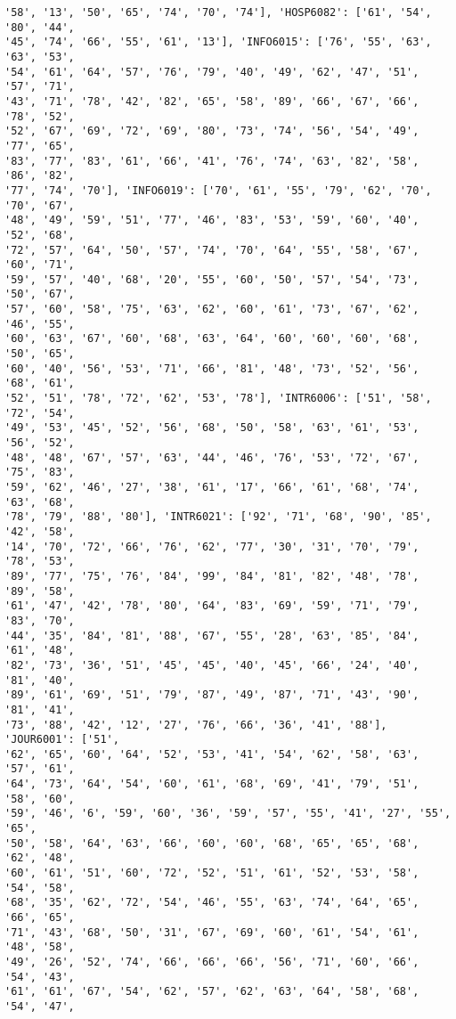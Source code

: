 \documentclass[11pt]{article}
\begin{document}
\begin{Verbatim}[commandchars=\\\{\}]
'58', '13', '50', '65', '74', '70', '74'], 'HOSP6082': ['61', '54', '80', '44',
'45', '74', '66', '55', '61', '13'], 'INFO6015': ['76', '55', '63', '63', '53',
'54', '61', '64', '57', '76', '79', '40', '49', '62', '47', '51', '57', '71',
'43', '71', '78', '42', '82', '65', '58', '89', '66', '67', '66', '78', '52',
'52', '67', '69', '72', '69', '80', '73', '74', '56', '54', '49', '77', '65',
'83', '77', '83', '61', '66', '41', '76', '74', '63', '82', '58', '86', '82',
'77', '74', '70'], 'INFO6019': ['70', '61', '55', '79', '62', '70', '70', '67',
'48', '49', '59', '51', '77', '46', '83', '53', '59', '60', '40', '52', '68',
'72', '57', '64', '50', '57', '74', '70', '64', '55', '58', '67', '60', '71',
'59', '57', '40', '68', '20', '55', '60', '50', '57', '54', '73', '50', '67',
'57', '60', '58', '75', '63', '62', '60', '61', '73', '67', '62', '46', '55',
'60', '63', '67', '60', '68', '63', '64', '60', '60', '60', '68', '50', '65',
'60', '40', '56', '53', '71', '66', '81', '48', '73', '52', '56', '68', '61',
'52', '51', '78', '72', '62', '53', '78'], 'INTR6006': ['51', '58', '72', '54',
'49', '53', '45', '52', '56', '68', '50', '58', '63', '61', '53', '56', '52',
'48', '48', '67', '57', '63', '44', '46', '76', '53', '72', '67', '75', '83',
'59', '62', '46', '27', '38', '61', '17', '66', '61', '68', '74', '63', '68',
'78', '79', '88', '80'], 'INTR6021': ['92', '71', '68', '90', '85', '42', '58',
'14', '70', '72', '66', '76', '62', '77', '30', '31', '70', '79', '78', '53',
'89', '77', '75', '76', '84', '99', '84', '81', '82', '48', '78', '89', '58',
'61', '47', '42', '78', '80', '64', '83', '69', '59', '71', '79', '83', '70',
'44', '35', '84', '81', '88', '67', '55', '28', '63', '85', '84', '61', '48',
'82', '73', '36', '51', '45', '45', '40', '45', '66', '24', '40', '81', '40',
'89', '61', '69', '51', '79', '87', '49', '87', '71', '43', '90', '81', '41',
'73', '88', '42', '12', '27', '76', '66', '36', '41', '88'], 'JOUR6001': ['51',
'62', '65', '60', '64', '52', '53', '41', '54', '62', '58', '63', '57', '61',
'64', '73', '64', '54', '60', '61', '68', '69', '41', '79', '51', '58', '60',
'59', '46', '6', '59', '60', '36', '59', '57', '55', '41', '27', '55', '65',
'50', '58', '64', '63', '66', '60', '60', '68', '65', '65', '68', '62', '48',
'60', '61', '51', '60', '72', '52', '51', '61', '52', '53', '58', '54', '58',
'68', '35', '62', '72', '54', '46', '55', '63', '74', '64', '65', '66', '65',
'71', '43', '68', '50', '31', '67', '69', '60', '61', '54', '61', '48', '58',
'49', '26', '52', '74', '66', '66', '66', '56', '71', '60', '66', '54', '43',
'61', '61', '67', '54', '62', '57', '62', '63', '64', '58', '68', '54', '47',

\end{Verbatim}
\end{document}
